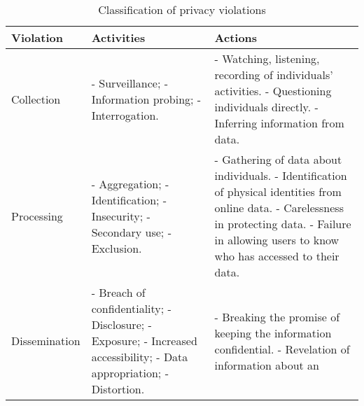 \begin{table*}[ht]
\centering
\caption{Classification of privacy violations}
\def\arraystretch{2.0}
\begin{tabular}{ | p{6em} || p{6em} || p{14em} |}
  \hline
   \textbf{Violation} & \textbf{Activities} & \textbf{Actions} \\
  \hline
  \hline
Collection	
    & - Surveillance; \newline
      - Information \newline
      probing; \newline
      - Interrogation.
    & - Watching, listening, recording of \newline 
        individuals' activities. \newline
      - Questioning individuals directly. \newline
      - Inferring information from data.\\
  \hline
Processing 			
    & - Aggregation; \newline
      - Identification; \newline
      - Insecurity; \newline
      - Secondary \newline
        use; \newline
      - Exclusion.						
    & - Gathering of data about individuals. \newline
      - Identification of physical identities \newline
        from online data. \newline
      - Carelessness in protecting data. \newline
      - Failure in allowing users to know \newline
        who has accessed to their data. \\
  \hline
Dissemination 			
    & - Breach of \newline
        confidentiality; \newline
      - Disclosure; \newline
      - Exposure; \newline 
      - Increased \newline
        accessibility; \newline
      - Data appropriation; \newline
      - Distortion.
    & - Breaking the promise of keeping the information confidential. \newline
      - Revelation of information about an \newline

\end{tabular}
\end{table*}
